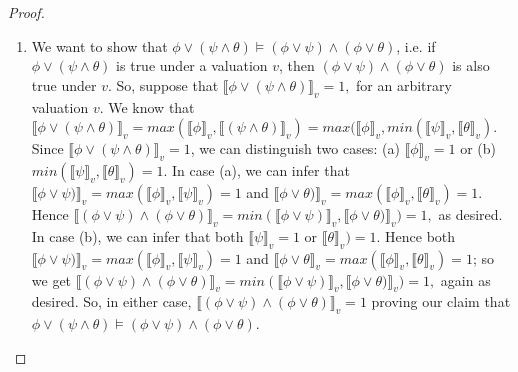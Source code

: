 \begin{enumerate}
\begin{enumerate}[(i)]
\begin{proof}
\begin{enumerate}[1.]
			 	\item We want to show that $\phi\lor(\psi\land\theta)\vDash (\phi\lor\psi)\land(\phi\lor\theta)$, i.e. if $\phi\lor(\psi\land\theta)$ is true under a valuation $v$, then  $(\phi\lor\psi)\land(\phi\lor\theta)$ is also true under $v$. So, suppose that $\llbracket \phi\lor(\psi\land\theta)\rrbracket_v=1,$ for an arbitrary valuation $v$. We know that $\llbracket \phi\lor(\psi\land\theta)\rrbracket_v=max(\llbracket\phi\rrbracket_v, \llbracket (\psi\land\theta)\rrbracket_v)=max(\llbracket\phi\rrbracket_v, min(\llbracket \psi\rrbracket_v,\llbracket\theta\rrbracket_v)$. Since $\llbracket \phi\lor(\psi\land\theta)\rrbracket_v=1$, we can distinguish two cases: (a) $\llbracket\phi\rrbracket_v=1$ or (b) $min(\llbracket \psi\rrbracket_v,\llbracket\theta\rrbracket_v)=1$. In case (a), we can infer that $\llbracket \phi\lor\psi)\rrbracket_v=max(\llbracket\phi\rrbracket_v,\llbracket\psi\rrbracket_v)=1$ and $\llbracket \phi\lor\theta)\rrbracket_v=max(\llbracket\phi\rrbracket_v,\llbracket\theta\rrbracket_v)=1$. Hence $\llbracket (\phi\lor\psi)\land(\phi\lor\theta)\rrbracket_v=min(\llbracket \phi\lor\psi)\rrbracket_v, \llbracket \phi\lor\theta)\rrbracket_v)=1,$ as desired. In case (b), we can infer that both $\llbracket \psi\rrbracket_v=1$ or $\llbracket\theta\rrbracket_v)=1$. Hence both $\llbracket \phi\lor\psi)\rrbracket_v=max(\llbracket\phi\rrbracket_v,\llbracket\psi\rrbracket_v)=1$ and $\llbracket \phi\lor\theta\rrbracket_v=max(\llbracket\phi\rrbracket_v,\llbracket\theta\rrbracket_v)=1$; so we get $\llbracket (\phi\lor\psi)\land(\phi\lor\theta)\rrbracket_v=min(\llbracket \phi\lor\psi)\rrbracket_v, \llbracket \phi\lor\theta)\rrbracket_v)=1,$ again as desired. So, in either case, $\llbracket (\phi\lor\psi)\land(\phi\lor\theta)\rrbracket_v=1$ proving our claim that $\phi\lor(\psi\land\theta)\vDash (\phi\lor\psi)\land(\phi\lor\theta)$.
				

\end{enumerate}
\end{proof}
\end{enumerate}
\end{enumerate}
